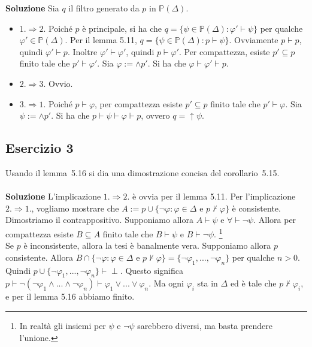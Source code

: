 \documentclass[10pt,a4paper]{article}
\def\phi{\varphi}
\def\A{\forall}
\begin{document}
\noindent\textbf{Soluzione} Sia $q$ il filtro generato da $p$ in $\mathbb{P}(\Delta)$.
\begin{itemize}
\item $1. \Rightarrow 2.$ Poiché $p$ è principale, si ha che $q=\{ \psi \in \mathbb{P}(\Delta) : \phi' \vdash \psi \}$ per qualche $\phi' \in \mathbb{P}(\Delta)$. Per il lemma 5.11, $q=\{ \psi \in \mathbb{P}(\Delta) : p \vdash \psi \}$. 
Ovviamente $p \vdash p$, quindi $\phi' \vdash p$. Inoltre $\phi' \vdash \phi'$, quindi $p \vdash \phi'$. 
Per compattezza, esiste $p' \subseteq p$ finito tale che $p' \vdash \phi'$. Sia $\phi:= \wedge p'$. Si ha che $\phi \vdash \phi' \vdash p$.
\item $2. \Rightarrow 3.$ Ovvio.
\item $3. \Rightarrow 1.$ Poiché $p \vdash \phi$, per compattezza esiste $p' \subseteq p$ finito tale che $p' \vdash \phi$. Sia $\psi := \wedge p'$. Si ha che $p \vdash \psi \vdash \phi \vdash p$, ovvero $q=\uparrow\psi$.
\end{itemize}

\subsection*{Esercizio 3}
Usando il lemma~5.16 si dia una dimostrazione concisa del corollario~5.15.\\
\\
\noindent\textbf{Soluzione}
L'implicazione $1. \Rightarrow 2.$ è ovvia per il lemma 5.11. Per l'implicazione $2. \Rightarrow 1.$, vogliamo mostrare che $A:=p \cup \{ \neg\phi : \phi \in \Delta \text{ e } p \not\vdash \phi \}$ è consistente. Dimostriamo il contrappositivo. Supponiamo allora $A \vdash \psi$ e $\A \vdash \neg \psi$. Allora per compattezza esiste $B \subseteq A$ finito tale che $B \vdash \psi$ e $B \vdash \neg\psi$. \footnote{In realtà gli insiemi per $\psi$ e $\neg\psi$ sarebbero diversi, ma basta prendere l'unione.}\\
Se $p$ è inconsistente, allora la tesi è banalmente vera. Supponiamo allora $p$ consistente. Allora $B \cap \{ \neg\phi : \phi \in \Delta \text{ e } p \not\vdash \phi \} = \{\neg\phi_1,...,\neg\phi_n\}$ per qualche $n>0$. Quindi $p \cup \{\neg\phi_1,...,\neg\phi_n\} \vdash \perp$. Questo significa $p \vdash \neg(\neg\phi_1 \wedge ... \wedge \neg\phi_n) \vdash \phi_1 \vee ... \vee \phi_n$. Ma ogni $\phi_i$ sta in $\Delta$ ed è tale che $p \not\vdash \phi_i$, e per il lemma 5.16 abbiamo finito.
\end{document}
